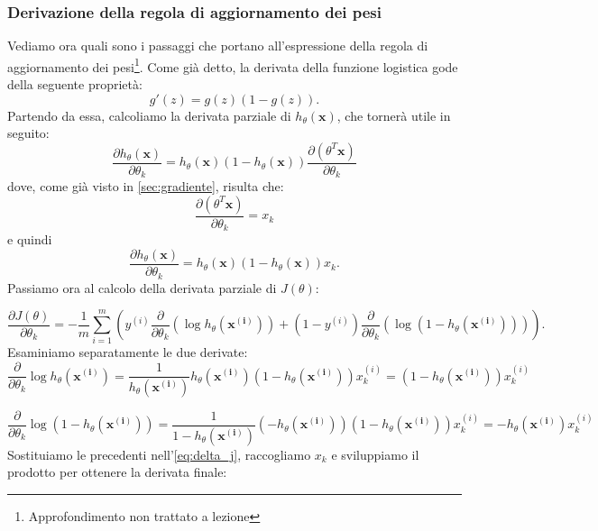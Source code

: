 \subsubsection{Derivazione della regola di aggiornamento dei pesi}\label{sec:dim_log_regr}
Vediamo ora quali sono i passaggi che portano all'espressione della regola di aggiornamento dei pesi\footnote{Approfondimento non trattato a lezione}. Come già detto, la derivata della funzione logistica gode della seguente proprietà:
\begin{equation*}
g'(z) =g(z)(1-g(z)).
\end{equation*}
Partendo da essa, calcoliamo la derivata parziale di $h_\theta(\mathbf{x})$, che tornerà utile in seguito:
\begin{equation*}
\frac{\partial h_\theta(\mathbf{x})}{\partial \theta_k} = h_\theta(\mathbf{x}) (1-h_\theta(\mathbf{x})) \frac{\partial (\theta^T \mathbf{x})}{\partial \theta_k}
\end{equation*}
dove, come già visto in \autoref{sec:gradiente}, risulta che:
\begin{equation*}
\frac{\partial (\theta^T \mathbf{x})}{\partial \theta_k} = x_k
\end{equation*}
e quindi
\begin{equation*}
\frac{\partial h_\theta(\mathbf{x})}{\partial \theta_k} = h_\theta(\mathbf{x}) (1-h_\theta(\mathbf{x})) x_k.
\end{equation*}
Passiamo ora al calcolo della derivata parziale di $J(\theta)$:

 \begin{equation}\label{eq:delta_j}
 \frac{\partial J(\theta)}{\partial \theta_k} = -\frac{1}{m}\sum_{i=1}^m \left( {y^{(i)}} \frac{\partial}{\partial \theta_k}(\log{h_\theta(\mathbf{x^{(i)}})}) + (1-y^{(i)})
 \frac{\partial}{\partial \theta_k}(\log{(1 - h_\theta(\mathbf{x^{(i)}}))}) \right).
\end{equation}
Esaminiamo separatamente le due derivate:
\begin{equation*}
\frac{\partial}{\partial \theta_k}\log{h_\theta(\mathbf{x^{(i)}})} = \frac{1}{h_\theta(\mathbf{x^{(i)}})} h_\theta(\mathbf{x^{(i)}}) (1-h_\theta(\mathbf{x^{(i)}})) x_k^{(i)} =  (1-h_\theta(\mathbf{x^{(i)}})) x_k^{(i)}
\end{equation*}

\begin{equation*}
\frac{\partial}{\partial \theta_k}\log{(1 - h_\theta(\mathbf{x^{(i)}}))} = \frac{1}{1- h_\theta(\mathbf{x^{(i)}})} (-h_\theta(\mathbf{x^{(i)}})) (1-h_\theta(\mathbf{x^{(i)}})) x_k^{(i)} =  -h_\theta(\mathbf{x^{(i)}}) x_k^{(i)}
\end{equation*}
Sostituiamo le precedenti nell'\autoref{eq:delta_j}, raccogliamo $x_k$ e sviluppiamo il prodotto per ottenere la derivata finale:

